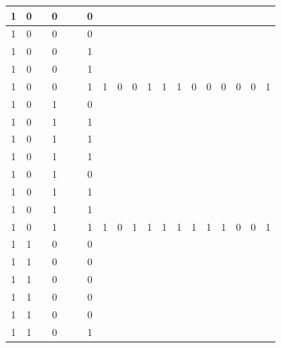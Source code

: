 \begin{table}[!tb]
\begin{tabular}{|c|c|c|c|c|c|c|c|c|c|c|c|c|c|c|c|c|c|c|}
        \rowcolor{yellow!40} 1 & 0 &  & 0 &  &  & 0 &  &  &  &  &  &  &  &  &  &  &  &  \\ \hline
        \rowcolor{yellow!40} 1 & 0 &  & 0 &  &  & 0 &  &  &  &  &  &  &  &  &  &  &  &  \\ \hline
        \rowcolor{yellow!40} 1 & 0 &  & 0 &  &  & 1 &  &  &  &  &  &  &  &  &  &  &  &  \\ \hline
        \rowcolor{yellow!40} 1 & 0 &  & 0 &  &  & 1 &  &  &  &  &  &  &  &  &  &  &  &  \\ \hline
        \rowcolor{yellow!40} 1 & 0 &  & 0 &  &  & 1 & 1 & 0 & 0 & 1 & 1 & 1 & 0 & 0 & 0 & 0 & 0 & 1 \\ \hline
        \rowcolor{gray!40} 1 & 0 &  & 1 &  &  & 0 &  &  &  &  &  &  &  &  &  &  &  &  \\ \hline
        \rowcolor{gray!40} 1 & 0 &  & 1 &  &  & 1 &  &  &  &  &  &  &  &  &  &  &  &  \\ \hline
        \rowcolor{gray!40} 1 & 0 &  & 1 &  &  & 1 &  &  &  &  &  &  &  &  &  &  &  &  \\ \hline
        \rowcolor{gray!40} 1 & 0 &  & 1 &  &  & 1 &  &  &  &  &  &  &  &  &  &  &  &  \\ \hline
        \rowcolor{gray!40} 1 & 0 &  & 1 &  &  & 0 &  &  &  &  &  &  &  &  &  &  &  &  \\ \hline
        \rowcolor{gray!40} 1 & 0 &  & 1 &  &  & 1 &  &  &  &  &  &  &  &  &  &  &  &  \\ \hline
        \rowcolor{gray!40} 1 & 0 &  & 1 &  &  & 1 &  &  &  &  &  &  &  &  &  &  &  &  \\ \hline
        \rowcolor{gray!40} 1 & 0 &  & 1 &  &  & 1 & 1 & 0 & 1 & 1 & 1 & 1 & 1 & 1 & 1 & 0 & 0 & 1 \\ \hline
        \rowcolor{blue!40} 1 & 1 &  & 0 &  &  & 0 &  &  &  &  &  &  &  &  &  &  &  &  \\ \hline
        \rowcolor{blue!40} 1 & 1 &  & 0 &  &  & 0 &  &  &  &  &  &  &  &  &  &  &  &  \\ \hline
        \rowcolor{blue!40} 1 & 1 &  & 0 &  &  & 0 &  &  &  &  &  &  &  &  &  &  &  &  \\ \hline
        \rowcolor{blue!40} 1 & 1 &  & 0 &  &  & 0 &  &  &  &  &  &  &  &  &  &  &  &  \\ \hline
        \rowcolor{blue!40} 1 & 1 &  & 0 &  &  & 0 &  &  &  &  &  &  &  &  &  &  &  &  \\ \hline
        \rowcolor{blue!40} 1 & 1 &  & 0 &  &  & 1 &  &  &  &  &  &  &  &  &  &  &  &  \\ \hline

\end{tabular}
\end{table}

